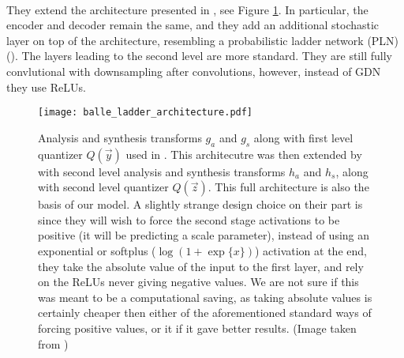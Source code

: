 \paragraph{\cite{balle2018variational}} They extend the architecture presented in
\cite{balle2016end}, see Figure \ref{fig:balle_ladder_arch}.
In particular, the encoder and decoder remain the same,
and they add an additional stochastic layer on top of the architecture,
resembling a probabilistic ladder network (PLN) (\cite{sonderby2016train}).
The layers leading to the second level are more standard. They are still fully
convlutional with downsampling after convolutions, however, instead of GDN
they use ReLUs.
\par

\begin{figure}
  \centering 
  \texttt{[image: balle\_ladder\_architecture.pdf]}
  \caption[Architecture used by \cite{balle2018variational}.]
  {Analysis and synthesis transforms $g_a$ and $g_s$ along with first
    level quantizer $Q(\vec{y})$ used in \cite{balle2016end}. This architecutre
    was then extended by \cite{balle2018variational} with second level analysis
    and synthesis transforms $h_a$ and $h_s$, along with second level quantizer
    $Q(\vec{z})$. This full architecture is also the basis of our model. A
    slightly strange design choice on their part is since they will wish to
    force the second stage activations to be positive (it will be predicting
    a scale parameter), instead of using an exponential or softplus
    ($\log (1 + \exp\{x\})$) activation at the end, they take the absolute value
    of the input to the first layer, and rely on the ReLUs never giving negative
    values. We are not sure if this was meant to be a computational saving, as
    taking absolute values is certainly cheaper then either of the
    aforementioned standard ways of forcing positive values, or it if it gave
    better results.
    (Image taken from \cite{balle2018variational})}
  \label{fig:balle_ladder_arch}
\end{figure}

